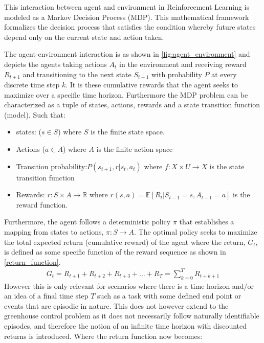 This interaction between agent and environment in Reinforcement Learning is modeled as a Markov Decision Process (MDP). This mathematical framework formalizes the decision process that satisfies the condition whereby future states depend only on the current state and action taken.

The agent-environment interaction is as shown in \autoref{fig:agent_environment} and depicts the agents taking actions $A_t$ in the environment and receiving reward $R_{t+1}$ and transitioning to the next state $S_{t+1}$ with probability $P$ at every discrete time step $k$. It is these cumulative rewards that the agent seeks to maximize over a specific time horizon. Furthermore the MDP problem can be characterized as a tuple of states, actions, rewards and a state transition function (model). Such that:

\begin{itemize}
	\item states: ($s\in S$) where $S$ is the finite state space.
	\item Actions ($a \in A$) where $A$ is the finite action space
	\item Transition probability:$P(s_{t+1},r | s_t, a_t)$   where $f:X\times U \rightarrow X$ is the state transition function
	\item Rewards: $r:S\times A \rightarrow \mathbb{R}$ where $r(s,a) = \mathbb{E}[R_t | S_{t-1} =s, A_{t-1} = a]$  is the reward function.
\end{itemize}


Furthermore, the agent follows a deterministic policy $\pi$ that establishes a mapping from states to actions, $\pi: S \rightarrow A$. The optimal policy seeks to maximize the total expected return (cumulative reward) of the agent where the return, $G_t$, is defined as some specific function of the reward sequence \cite{suttonReinforcementLearningIntroduction2014} as shown in \autoref{return_function}. 
\begin{equation}
	\begin{aligned}
		G_t  = R_{t+1} + R_{t+2} + R_{t+3} + \dots + R_{T} = \sum_{k=0}^TR_{t+k+1}
	\end{aligned}
	\label{return_function}
\end{equation}
However this is only relevant for scenarios where there is a time horizon and/or an idea of a final time step $T$ such as a task with some defined end point or events that are episodic in nature. This does not however extend to the greenhouse control problem as it does not necessarily follow naturally identifiable episodes, and therefore the notion of an infinite time horizon with discounted returns is introduced. Where the return function now becomes:

